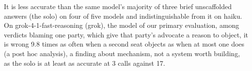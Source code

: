 It is less accurate
than the same model's majority of three brief unscaffolded answers (the solo) on four
of five models and indistinguishable from it on haiku. On grok-4-1-fast-reasoning (grok),
the model of our primary evaluation, among
verdicts blaming one party, which give that party's advocate a reason to
object, it is wrong 9.8 times as often when a second
seat objects as when at most one does (a post hoc
analysis), a finding about mechanism, not a system worth building, as the solo is at
least as accurate at 3 calls against 17.
